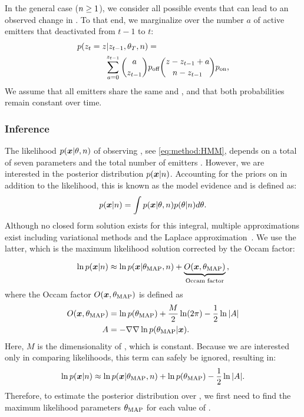 In the general case ($n\geq1$), we consider all possible events that can
lead to an observed change in \z{}. To that end, we marginalize over the
number $a$ of active emitters that deactivated from $t-1$ to $t$:
  \begin{align}
    \label{eq:method:transition}
    p(z_{t} = z | z_{t-1}, \theta_{T}, n) &=\\
    \sum_{a = 0}^{z_{t-1}}
      {a \choose z_{t-1}}
      &\poff
      {z - z_{t-1} + a \choose \n - z_{t-1}}
      \pon
      \text{,} \notag
  \end{align}
  We assume that all emitters share the same \pon and \poff, and that
  both probabilities remain constant over time.


\subsubsection{Inference}

The likelihood $p(\bm{x}|\theta,n)$ of observing \trace, see
\eqref{eq:method:HMM}, depends on a total of seven parameters
\parameters and the total number of emitters \n.
  However, we are interested in the posterior distribution $p(\bm{x}|n)$.
  Accounting for the priors on \parameters in addition to the likelihood,
  this is known as the model evidence and is defined as:
  \begin{equation*}
    p(\bm{x} | n) = \int p(\bm{x} | \theta, n) p(\theta | n) d\theta
    \text{.}
  \end{equation*}
  Although no closed form solution exists for this integral, multiple approximations exist including 
  variational methods \cite{bronson_learning_2009} and the Laplace approximation~\citep{bishop_pattern_2006}.
  We use the latter, which is the maximum likelihood solution corrected by the Occam factor:

  \begin{equation}
    \ln p(\bm{x} | n) \approx
      \ln p(\bm{x} | \theta_\text{MAP}, n) +
      \underbrace{O(\bm{x}, \theta_\text{MAP})}_\text{Occam factor}
    \text{,}
    \label{eq:method:evidence_with_m}
  \end{equation}
  where the Occam factor $O(\bm{x}, \theta_\text{MAP})$ is defined as
  \begin{align*}
    O(\bm{x}, \theta_\text{MAP}) &=
      \ln p(\theta_\text{MAP}) +
      \frac{M}{2} \ln(2\pi) -
      \frac{1}{2} \ln |A|
    \\
    A &=
      -\nabla \nabla \ln p(\theta_\text{MAP} | \bm{x})
    \text{.}
  \end{align*}
  Here, $M$ is the dimensionality of \parameters, which is constant.
  Because we are interested only in comparing likelihoods, this term can 
  safely be ignored, resulting in:
  \begin{equation}
    \ln p(\bm{x} | n) \approx \ln p(\bm{x} | \theta_\text{MAP}, n) + \ln p(\theta_\text{MAP}) - \frac{1}{2} \ln |A|
    \text{.}
    \label{eq:method:evidence}
  \end{equation}
  Therefore, to estimate the posterior distribution over \n, we first need to 
  find the maximum likelihood parameters $\theta_\text{MAP}$ for each value of \n. 

